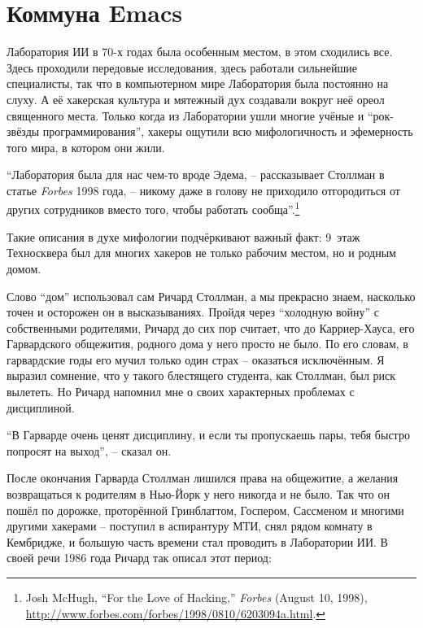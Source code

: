 
\chapter{Коммуна Emacs}

Лаборатория ИИ в 70-х годах была особенным местом, в этом сходились все. Здесь проходили передовые исследования, здесь работали сильнейшие специалисты, так что в компьютерном мире Лаборатория была постоянно на слуху. А её хакерская культура и мятежный дух создавали вокруг неё ореол священного места. Только когда из Лаборатории ушли многие учёные и \enquote{рок-звёзды программирования}, хакеры ощутили всю мифологичность и эфемерность того мира, в котором они жили.

\enquote{Лаборатория была для нас чем-то вроде Эдема, -- рассказывает Столлман в статье \textit{Forbes} 1998 года, -- никому даже в голову не приходило отгородиться от других сотрудников вместо того, чтобы работать сообща}.\footnote{Josh McHugh, \enquote{For the Love of Hacking,} \textit{Forbes} (August 10, 1998), \url{http://www.forbes.com/forbes/1998/0810/6203094a.html}.}

Такие описания в духе мифологии подчёркивают важный факт: 9~этаж Техносквера был для многих хакеров не только рабочим местом, но и родным домом.

Слово \enquote{дом} использовал сам Ричард Столлман, а мы прекрасно знаем, насколько точен и осторожен он в высказываниях. Пройдя через \enquote{холодную войну} с собственными родителями, Ричард до сих пор считает, что до Карриер-Хауса, его Гарвардского общежития, родного дома у него просто не было. По его словам, в гарвардские годы его мучил только один страх -- оказаться исключённым. Я выразил сомнение, что у такого блестящего студента, как Столлман, был риск вылететь. Но Ричард напомнил мне о своих характерных проблемах с дисциплиной.

\enquote{В Гарварде очень ценят дисциплину, и если ты пропускаешь пары, тебя быстро попросят на выход}, -- сказал он.

После окончания Гарварда Столлман лишился права на общежитие, а желания возвращаться к родителям в Нью-Йорк у него никогда и не было. Так что он пошёл по дорожке, проторённой Гринблаттом, Госпером, Сассменом и многими другими хакерами -- поступил в аспирантуру МТИ, снял рядом комнату в Кембридже, и большую часть времени стал проводить в Лаборатории ИИ. В своей речи 1986 года Ричард так описал этот период:

